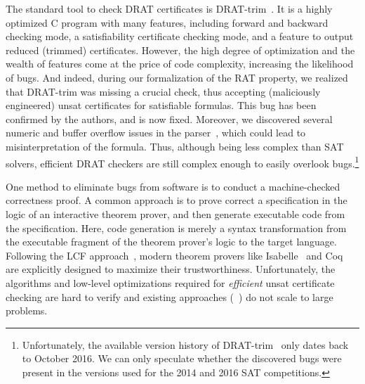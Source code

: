 \documentclass{llncs}
\begin{document}
The standard tool to check DRAT certificates is DRAT-trim~\cite{WHH14,drat-trim-webpage}. 
It is a highly optimized C program with many features, including forward and backward checking mode, a satisfiability certificate checking mode,
and a feature to output reduced (trimmed) certificates.
% 
% 
However, the high degree of optimization and the wealth of features come at the price of code complexity, increasing the likelihood of bugs. And indeed, 
during our formalization of the RAT property, we realized that DRAT-trim was missing a crucial check, thus accepting (maliciously engineered) unsat certificates 
for satisfiable formulas. This bug has been confirmed by the authors, and is now fixed.
Moreover, we discovered several numeric and buffer overflow issues in the parser~\cite{drat-trim-issues}, which could lead to misinterpretation of the formula.
Thus, although being less complex than SAT solvers, efficient DRAT checkers are still complex enough to easily overlook bugs.\footnote{Unfortunately, the available version history of DRAT-trim~\cite{drat-trim-github} only dates back to October 2016. We can only speculate whether the discovered bugs were present in the versions used for the 2014 and 2016 SAT competitions.} 

One method to eliminate bugs from software is to conduct a machine-checked correctness proof. 
A common approach is to prove correct a specification in the logic of an interactive theorem prover, and then generate executable code from 
the specification. Here, code generation is merely a syntax transformation from the executable fragment of the theorem prover's logic to the target language.
Following the LCF approach~\cite{Gord00}, modern theorem provers like Isabelle~\cite{NPW02} and Coq~\cite{BeCa10} are explicitly designed to maximize their trustworthiness.
Unfortunately, the algorithms and low-level optimizations required for \emph{efficient} unsat certificate checking are 
hard to verify and existing approaches (\eg~\cite{DFM10,WHH13}) do not scale to large problems.
\end{document}
